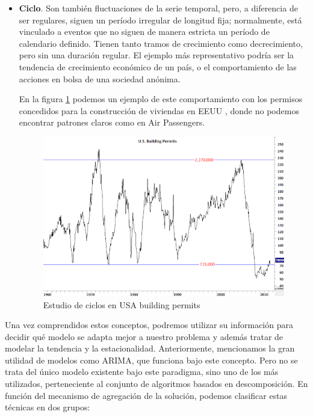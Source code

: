 \begin{itemize}
    \item \textbf{Ciclo}. Son también fluctuaciones de la serie temporal, pero, a diferencia de ser regulares, siguen un período irregular de longitud fija; normalmente, está vinculado a eventos que no siguen de manera estricta un período de calendario definido. Tienen tanto tramos de crecimiento como decrecimiento, pero sin una duración regular. El ejemplo más representativo podría ser la tendencia de crecimiento económico de un país, o el comportamiento de las acciones en bolsa de una sociedad anónima.

    En la figura \ref{ciclo} podemos un ejemplo de este comportamiento con los permisos concedidos para la construcción de viviendas en EEUU \cite{techcharts2012housing}, donde no podemos encontrar patrones claros como en Air Passengers.

    \begin{figure}[!ht] %
        \centering
        \includegraphics[scale=0.55]{img/ciclo}
        \caption{Estudio de ciclos en USA building permits}
        \label{ciclo}
    \end{figure}

\end{itemize}

Una vez comprendidos estos conceptos, podremos utilizar su información para decidir qué modelo se adapta mejor a nuestro problema y además tratar de modelar la tendencia y la estacionalidad. Anteriormente, mencionamos la gran utilidad de modelos como ARIMA, que funciona bajo este concepto. Pero no se trata del único modelo existente bajo este paradigma, sino uno de los más utilizados, perteneciente al conjunto de algoritmos basados en descomposición. En función del mecanismo de agregación de la solución, podemos clasificar estas técnicas en dos grupos:

